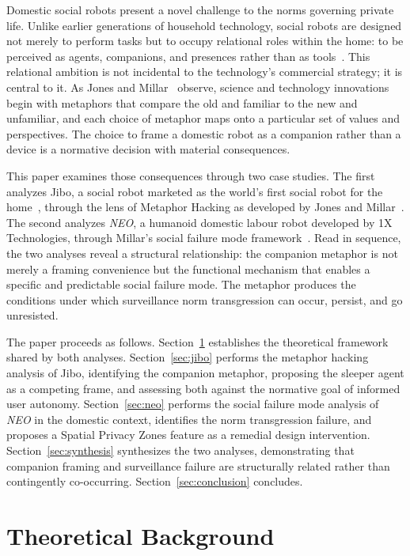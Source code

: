\documentclass{ieee-portfolio}
\newcommand{\neo}{\textit{NEO}}
\begin{document}
Domestic social robots present a novel challenge to the norms governing private life. Unlike earlier generations of household technology, social robots are designed not merely to perform tasks but to occupy relational roles within the home: to be perceived as agents, companions, and presences rather than as tools~\cite{ananto_robot_2020}. This relational ambition is not incidental to the technology's commercial strategy; it is central to it. As Jones and Millar~\cite{jones_hacking_2017} observe, science and technology innovations begin with metaphors that compare the old and familiar to the new and unfamiliar, and each choice of metaphor maps onto a particular set of values and perspectives. The choice to frame a domestic robot as a companion rather than a device is a normative decision with material consequences.

This paper examines those consequences through two case studies. The first analyzes Jibo, a social robot marketed as the world's first social robot for the home~\cite{breazeal_jibo_2014}, through the lens of Metaphor Hacking as developed by Jones and Millar~\cite{jones_hacking_2017}. The second analyzes \neo{}, a humanoid domestic labour robot developed by 1X Technologies, through Millar's social failure mode framework~\cite{millar_social_2020}. Read in sequence, the two analyses reveal a structural relationship: the companion metaphor is not merely a framing convenience but the functional mechanism that enables a specific and predictable social failure mode. The metaphor produces the conditions under which surveillance norm transgression can occur, persist, and go unresisted.

The paper proceeds as follows. Section~\ref{sec:background} establishes the theoretical framework shared by both analyses. Section~\ref{sec:jibo} performs the metaphor hacking analysis of Jibo, identifying the companion metaphor, proposing the sleeper agent as a competing frame, and assessing both against the normative goal of informed user autonomy. Section~\ref{sec:neo} performs the social failure mode analysis of \neo{} in the domestic context, identifies the norm transgression failure, and proposes a Spatial Privacy Zones feature as a remedial design intervention. Section~\ref{sec:synthesis} synthesizes the two analyses, demonstrating that companion framing and surveillance failure are structurally related rather than contingently co-occurring. Section~\ref{sec:conclusion} concludes.

\section{Theoretical Background}
\label{sec:background}
\end{document}
